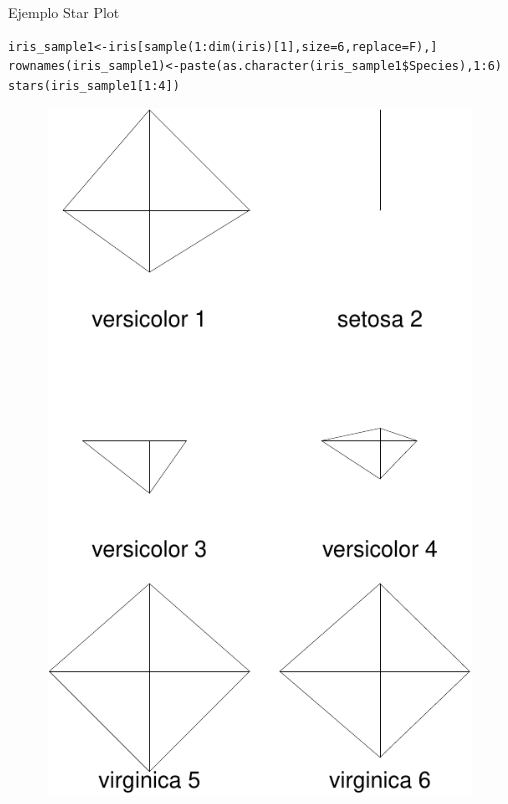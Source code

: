 \documentclass[handout]{beamer}
\begin{document}
\begin{frame}[fragile]{Ejemplo Star Plot}
\scriptsize{
\begin{verbatim}
iris_sample1<-iris[sample(1:dim(iris)[1],size=6,replace=F),]
rownames(iris_sample1)<-paste(as.character(iris_sample1$Species),1:6)
stars(iris_sample1[1:4]) 
\end{verbatim}

  \begin{figure}[h!]
	\centering
	\includegraphics[scale=0.4]{pics/star.pdf}		
\end{figure}   




}
 
\end{frame}
\end{document}
